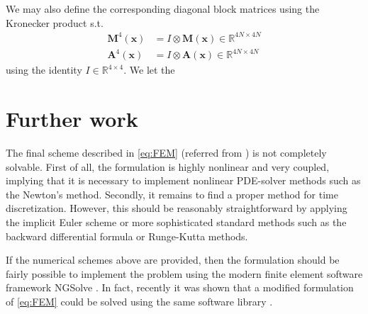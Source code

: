 We may also define the corresponding diagonal block matrices using the Kronecker product s.t.
\[
    \begin{split}
        \mathbf{M}^{4}( \mathbf{x} )  &= I \otimes \mathbf{M}( \mathbf{x}) \in \mathbb{R} ^{4N \times 4N} \\
\mathbf{A}^{4}( \mathbf{x} )   & = I \otimes \mathbf{A}( \mathbf{x}
) \in \mathbb{R} ^{4N \times 4N}
    \end{split}
\]
using the identity $I \in \mathbb{R} ^{4\times 4}$. We let the  




\section{Further work}
The final scheme described in \eqref{eq:FEM} (referred from \cite{kovacs2021convergent}) is not completely solvable. First of all, the formulation is highly nonlinear and very coupled, implying that it is necessary to implement nonlinear PDE-solver methods such as the Newton's method. Secondly, it remains to find a proper method for time discretization. However, this should be reasonably straightforward by applying the implicit Euler scheme or more sophisticated standard methods such as the backward differential formula or Runge-Kutta methods.

If the numerical schemes above are provided, then the formulation should be fairly possible to implement the problem using the modern finite element software framework NGSolve \cite{schoberl2017netgen}. In fact, recently it was shown that a modified formulation of \eqref{eq:FEM} could be solved using the same software library \cite{hu2022evolving}.
